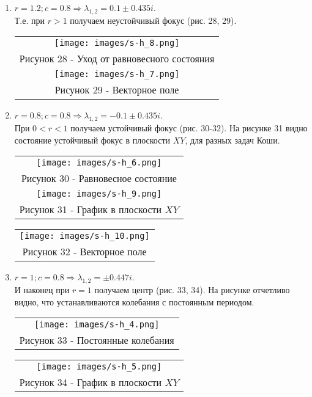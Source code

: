 \begin{enumerate}
  \item $r=1.2;c=0.8\Rightarrow \lambda_{1,2}=0.1\pm 0.435 i$.\\ Т.е. при $r>1$ получаем неустойчивый фокус (рис. 28, 29).
  \begin{center}
    \begin{tabular}{c}
      \texttt{[image: images/s-h\_8.png]}\\
      Рисунок 28 - Уход от равновесного состояния\\
      \texttt{[image: images/s-h\_7.png]}\\
      Рисунок 29 - Векторное поле
    \end{tabular}
  \end{center}
  \item $r=0.8;c=0.8\Rightarrow \lambda_{1,2}=-0.1\pm 0.435 i$.\\ При $0<r<1$ получаем устойчивый фокус (рис. 30-32).
На рисунке 31 видно состояние устойчивый фокус в плоскости $XY$, для разных задач Коши.
  \begin{center}
    \begin{tabular}{c}
      \texttt{[image: images/s-h\_6.png]}\\
      Рисунок 30 - Равновесное состояние\\
      \texttt{[image: images/s-h\_9.png]}\\
      Рисунок 31 - График в плоскости $XY$
      \end{tabular}
    \end{center}
  \begin{center}
    \begin{tabular}{c}
      \texttt{[image: images/s-h\_10.png]}\\
      Рисунок 32 - Векторное поле
    \end{tabular}
  \end{center}
  \item $r=1;c=0.8\Rightarrow \lambda_{1,2}=\pm 0.447 i$.\\ И наконец при $r=1$ получаем центр (рис. 33, 34). На рисунке отчетливо видно, что устанавливаются колебания с постоянным периодом.
  \begin{center}
    \begin{tabular}{c}
      \texttt{[image: images/s-h\_4.png]}\\
      Рисунок 33 - Постоянные колебания\\
      \end{tabular}
    \end{center}
    \begin{center}
      \begin{tabular}{c}
      \texttt{[image: images/s-h\_5.png]}\\
      Рисунок 34 - График в плоскости $XY$
    \end{tabular}
  \end{center}
\end{enumerate}
